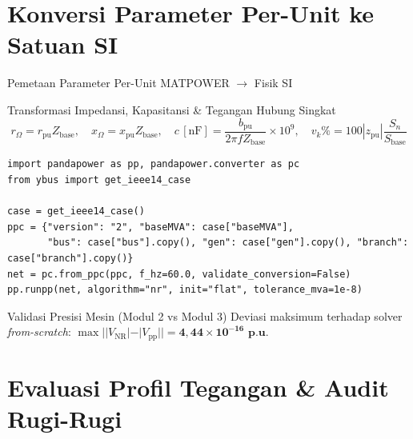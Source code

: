 \documentclass[aspectratio=169,10pt]{beamer}
\begin{document}
\section{Konversi Parameter Per-Unit ke Satuan SI}

\begin{frame}[fragile]{Pemetaan Parameter Per-Unit MATPOWER $\to$ Fisik SI}
  \begin{block}{Transformasi Impedansi, Kapasitansi \& Tegangan Hubung Singkat}
    \[
      r_{\Omega} = r_{\text{pu}} Z_{\text{base}},\quad
      x_{\Omega} = x_{\text{pu}} Z_{\text{base}},\quad
      c\,[\text{nF}] = \frac{b_{\text{pu}}}{2\pi f Z_{\text{base}}}\times 10^{9},\quad
      v_k\% = 100 |z_{\text{pu}}|\frac{S_n}{S_{\text{base}}}
    \]
  \end{block}
\begin{lstlisting}
import pandapower as pp, pandapower.converter as pc
from ybus import get_ieee14_case

case = get_ieee14_case()
ppc = {"version": "2", "baseMVA": case["baseMVA"],
       "bus": case["bus"].copy(), "gen": case["gen"].copy(), "branch": case["branch"].copy()}
net = pc.from_ppc(ppc, f_hz=60.0, validate_conversion=False)
pp.runpp(net, algorithm="nr", init="flat", tolerance_mva=1e-8)
\end{lstlisting}
  \begin{exampleblock}{Validasi Presisi Mesin (Modul 2 vs Modul 3)}
    Deviasi maksimum terhadap solver \textit{from-scratch}: $\max ||V_{\text{NR}}| - |V_{\text{pp}}|| = \mathbf{4{,}44 \times 10^{-16}\text{ p.u.}}$
  \end{exampleblock}
\end{frame}

\section{Evaluasi Profil Tegangan \& Audit Rugi-Rugi}
\end{document}
